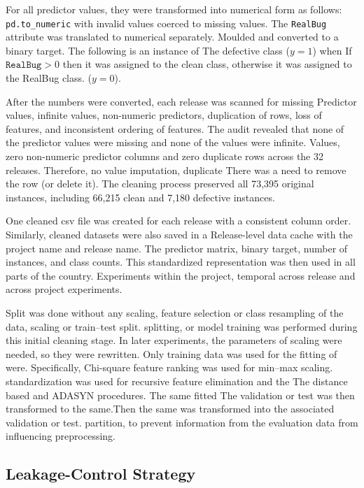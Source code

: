 \documentclass[conference]{IEEEtran}
\begin{document}
For all predictor values, they were transformed into numerical form as follows:
\texttt{pd.to\_numeric} with invalid values coerced to missing values.
The \texttt{RealBug} attribute was translated to numerical separately.
Moulded and converted to a binary target. The following is an instance of
The defective class (\(y=1\)) when
If \(\texttt{RealBug}>0\) then it was assigned to the clean class, otherwise it was assigned to the RealBug class.
(\(y=0\)).

After the numbers were converted, each release was scanned for missing
Predictor values, infinite values, non-numeric predictors,
duplication of rows, loss of features, and inconsistent ordering of features.
The audit revealed that none of the predictor values were missing and none of the values were infinite.
Values, zero non-numeric predictor columns and zero duplicate rows
across the 32 releases. Therefore, no value imputation, duplicate
There was a need to remove the row (or delete it). The cleaning process preserved
all 73,395 original instances, including 66,215 clean and 7,180
defective instances.

One cleaned csv file was created for each release with a
consistent column order. Similarly, cleaned datasets were also saved in a
Release-level data cache with the project name and release name.
The predictor matrix, binary target, number of instances, and class counts.
This standardized representation was then used in all parts of the country.
Experiments within the project, temporal across release and across project experiments.

Split was done without any scaling, feature selection or class resampling of the data, scaling or train--test split.
splitting, or model training was performed during this initial cleaning
stage. In later experiments, the parameters of scaling were needed, so they were rewritten.
Only training data was used for the fitting of were. Specifically,
Chi-square feature ranking was used for min--max scaling.
standardization was used for recursive feature elimination and the
The distance based and ADASYN procedures. The same fitted
The validation or test was then transformed to the same.Then the same was transformed into the associated validation or test.
partition, to prevent information from the evaluation data from
influencing preprocessing.


\subsection{Leakage-Control Strategy}
\label{subsec:leakage-control}
\end{document}

